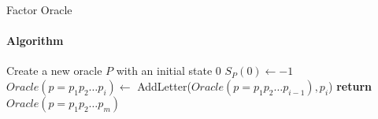 \begin{frame}[fragile]{Factor Oracle}
  \framesubtitle{Algorithm}
  \begin{algorithm}[H] \caption{Construction of a Factor Oracle}\label{alg:fo}
    \begin{algorithmic}[1]
      \State Create a new oracle $P$ with an initial state 0
      \State $S_{P}(0) \gets -1$
      \State $Oracle(p=p_{1}p_{2}\dots{}p_{i}) \gets$
      AddLetter($Oracle(p=p_{1}p_{2}\dots{}p_{i-1}), p_{i}$)
      \EndFor
      \State  \textbf{return} $Oracle(p=p_{1}p_{2}\dots{}p_{m})$
      \EndFunction
    \end{algorithmic}
  \end{algorithm}

  \begin{center}
  \end{center}
\end{frame}

